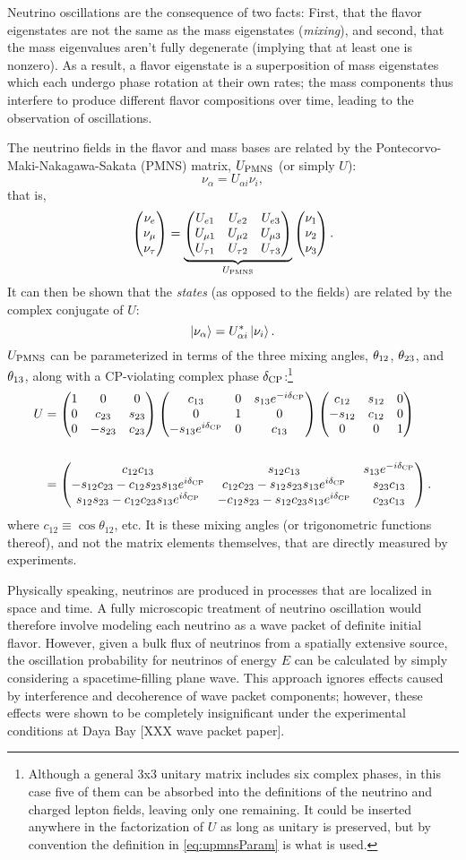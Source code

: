 \documentclass[../thesis.tex]{subfiles}
\begin{document}
Neutrino oscillations are the consequence of two facts: First, that the flavor
eigenstates are not the same as the mass eigenstates (\emph{mixing}), and
second, that the mass eigenvalues aren't fully degenerate (implying that at
least one is nonzero). As a result, a flavor eigenstate is a superposition of
mass eigenstates which each undergo phase rotation at their own rates; the mass
components thus interfere to produce different flavor compositions over time,
leading to the observation of oscillations.

The neutrino fields in the flavor and mass bases are related by the
Pontecorvo-Maki-Nakagawa-Sakata (PMNS) matrix, $U_\mathrm{PMNS}$ (or simply $U$):
\begin{equation*}
  \nu_\alpha = U_{\alpha i} \nu_i,
\end{equation*}
that is,
\begin{equation*}
  \begin{pmatrix} \nu_e \\ \nu_\mu \\ \nu_\tau \end{pmatrix} = \underbrace{\begin{pmatrix} U_{e 1} & U_{e 2} & U_{e 3} \\ U_{\mu 1} & U_{\mu 2} & U_{\mu 3} \\ U_{\tau 1} & U_{\tau 2} & U_{\tau 3} \end{pmatrix}}_{U_\mathrm{PMNS}} \begin{pmatrix} \nu_1 \\ \nu_2 \\ \nu_3 \end{pmatrix}.
\end{equation*}
It can then be shown that the \emph{states} (as opposed to the fields) are
related by the complex conjugate of $U$:
\begin{equation}
  \label{eq:nuStateRel}
  \ket{\nu_\alpha} = U^*_{\alpha i}\ket{\nu_i}.
\end{equation}
$U_\mathrm{PMNS}$ can be parameterized in terms of the three mixing angles, $\theta_{12}$,
$\theta_{23}$, and $\theta_{13}$, along with a CP-violating complex phase
$\delta_\text{CP}$:\footnote{Although a general 3x3 unitary matrix includes six complex
  phases, in this case five of them can be absorbed into the definitions of the
  neutrino and charged lepton fields, leaving only one remaining. It could be
  inserted anywhere in the factorization of $U$ as long as unitary is preserved,
  but by convention the definition in \eqref{eq:upmnsParam} is what is used.}
\begin{align}
  \label{eq:upmnsParam}
  \begin{split}
    U &= \begin{pmatrix} 1 & 0 & 0 \\ 0 & c_{23} & s_{23} \\ 0 & -s_{23} & c_{23} \end{pmatrix} \begin{pmatrix} c_{13} & 0 & s_{13}e^{-i\delta_\text{CP}} \\ 0 & 1 & 0 \\ -s_{13}e^{i\delta_\text{CP}} & 0 & c_{13} \end{pmatrix} \begin{pmatrix} c_{12} & s_{12} & 0 \\ -s_{12} & c_{12} & 0 \\ 0 & 0 & 1 \end{pmatrix} \\\\
    &= \begin{pmatrix} c_{12}c_{13} & s_{12} c_{13} & s_{13}e^{-i\delta_\text{CP}} \\ -s_{12}c_{23} - c_{12}s_{23}s_{13}e^{i\delta_\text{CP}} & c_{12}c_{23} - s_{12}s_{23}s_{13}e^{i\delta_\text{CP}} & s_{23}c_{13}\\s_{12}s_{23} - c_{12}c_{23}s_{13}e^{i\delta_\text{CP}} & -c_{12}s_{23} - s_{12}c_{23}s_{13}e^{i\delta_\text{CP}} & c_{23}c_{13} \end{pmatrix}.
  \end{split}
\end{align}
where \(c_{12} \equiv \cos\theta_{12}\), etc. It is these mixing angles (or
trigonometric functions thereof), and not the matrix elements themselves, that
are directly measured by experiments.

Physically speaking, neutrinos are produced in processes that are localized in
space and time. A fully microscopic treatment of neutrino oscillation would
therefore involve modeling each neutrino as a wave packet of definite initial
flavor. However, given a bulk flux of neutrinos from a spatially extensive
source, the oscillation probability for neutrinos of energy $E$ can be
calculated by simply considering a spacetime-filling plane wave. This approach
ignores effects caused by interference and decoherence of wave packet
components; however, these effects were shown to be completely insignificant
under the experimental conditions at Daya Bay [XXX wave packet paper].
\end{document}
